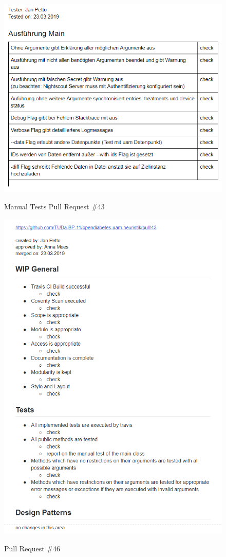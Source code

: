 \documentclass[accentcolor=tud0b,12pt,paper=a4]{tudreport}
\begin{document}
\begin{figure}[h]
\centering
\caption{Manual Tests Pull Request \#43}
\includegraphics[width=\textwidth,height=\textheight,keepaspectratio]{pr-tests-43}
\label{pr-tests:43}
\end{figure}

\begin{figure}[h]
\centering
\caption{Pull Request \#46}
\includegraphics[width=\textwidth,height=\textheight,keepaspectratio]{pr-46}
\label{pr:46}
\end{figure}
\end{document}
